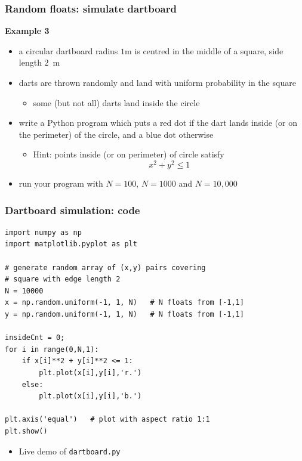 \documentclass[english,14pt]{beamer}
\newcommand\red[1]{{\color{red} #1}}
\newcommand\blue[1]{{\color{blue} #1}}
\begin{document}

\begin{frame}[fragile]

\frametitle{Random floats: simulate dartboard}

\textbf{Example 3}\\
\vspace*{1mm}
\begin{itemize}
	\item a circular dartboard radius $1$m is centred in the middle of a square, side length $2$~m
	\item darts are thrown randomly and land with uniform probability in the square
	\begin{itemize}
		\item some (but not all) darts land inside the circle
	\end{itemize}
	\item write a Python program which puts a \red{red} dot if the dart lands inside (or on the perimeter) of the circle, and a \blue{blue} dot otherwise
	\begin{itemize}
		\item Hint: points inside (or on perimeter) of circle satisfy
		\[
		x^2 + y^2 \leq 1
		\]
	\end{itemize}
	\item run your program with $N=100$, $N = 1000$ and $N = 10,000$
	
%	
%	
\end{itemize}

\end{frame}


\begin{frame}[fragile]

\frametitle{Dartboard simulation: code}
\begin{lstlisting}[style=CStyle,basicstyle=\scriptsize]
import numpy as np
import matplotlib.pyplot as plt

# generate random array of (x,y) pairs covering
# square with edge length 2
N = 10000
x = np.random.uniform(-1, 1, N)   # N floats from [-1,1]
y = np.random.uniform(-1, 1, N)   # N floats from [-1,1]

insideCnt = 0;
for i in range(0,N,1):
    if x[i]**2 + y[i]**2 <= 1:
        plt.plot(x[i],y[i],'r.')
    else:
        plt.plot(x[i],y[i],'b.')

plt.axis('equal')   # plot with aspect ratio 1:1
plt.show()
\end{lstlisting}
\vspace*{-3mm}
\begin{itemize}
	\item Live demo of \texttt{dartboard.py}
\end{itemize}
\end{frame}
\end{document}
